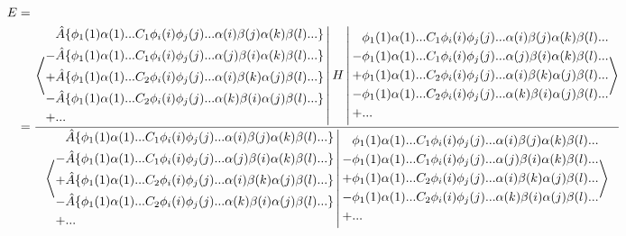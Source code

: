 \documentclass[a4paper]{article}
\begin{document}
 \begin{equation}
 \begin{aligned}
  E &= \\
     &= \frac{    \Braket{   
     \begin{aligned} 
     &\hat{A} \{ \phi_1(1)\alpha(1)... C_1 \phi_i(i) \phi_j(j) ... \alpha(i)\beta(j)\alpha(k)\beta(l)... \}   \\ 
 - &\hat{A} \{ \phi_1(1)\alpha(1)... C_1\phi_i(i) \phi_j(j) ...  \alpha(j)\beta(i)\alpha(k)\beta(l) ... \}\\ 
  +    &\hat{A} \{ \phi_1(1)\alpha(1)... C_2 \phi_i(i) \phi_j(j)... \alpha(i)\beta(k)\alpha(j)\beta(l)... \} \\ 
 - &\hat{A} \{ \phi_1(1)\alpha(1)... C_2\phi_i(i) \phi_j(j) ...  \alpha(k)\beta(i)\alpha(j)\beta(l)... \}\\ 
 +& ...
       \end{aligned} 
       |H|
   \begin{aligned} 
     & \phi_1(1)\alpha(1)... C_1 \phi_i(i) \phi_j(j)... \alpha(i)\beta(j)\alpha(k)\beta(l)...    \\ 
 - & \phi_1(1)\alpha(1)... C_1\phi_i(i) \phi_j(j) ...  \alpha(j)\beta(i)\alpha(k)\beta(l) ... \\ 
  +    & \phi_1(1)\alpha(1)... C_2 \phi_i(i) \phi_j(j)... \alpha(i)\beta(k)\alpha(j)\beta(l)...  \\ 
 - &\phi_1(1)\alpha(1)... C_2\phi_i(i) \phi_j(j) ...  \alpha(k)\beta(i)\alpha(j)\beta(l)... \\ 
 +& ...
       \end{aligned} 
         }   }
       {\Braket{   \begin{aligned} 
&\hat{A} \{ \phi_1(1)\alpha(1)... C_1 \phi_i(i) \phi_j(j) ... \alpha(i)\beta(j)\alpha(k)\beta(l)... \}   \\ 
 - &\hat{A} \{ \phi_1(1)\alpha(1)... C_1\phi_i(i) \phi_j(j) ...  \alpha(j)\beta(i)\alpha(k)\beta(l) ... \}\\ 
  +    &\hat{A} \{ \phi_1(1)\alpha(1)... C_2 \phi_i(i) \phi_j(j)... \alpha(i)\beta(k)\alpha(j)\beta(l)... \} \\ 
 - &\hat{A} \{ \phi_1(1)\alpha(1)... C_2\phi_i(i) \phi_j(j) ...  \alpha(k)\beta(i)\alpha(j)\beta(l)... \}\\ 
 +& ...
       \end{aligned}
              |
   \begin{aligned} 
      & \phi_1(1)\alpha(1)... C_1 \phi_i(i) \phi_j(j)... \alpha(i)\beta(j)\alpha(k)\beta(l)...    \\ 
 - & \phi_1(1)\alpha(1)... C_1\phi_i(i) \phi_j(j) ...  \alpha(j)\beta(i)\alpha(k)\beta(l) ... \\ 
  +    & \phi_1(1)\alpha(1)... C_2 \phi_i(i) \phi_j(j)... \alpha(i)\beta(k)\alpha(j)\beta(l)...  \\ 
 - &\phi_1(1)\alpha(1)... C_2\phi_i(i) \phi_j(j) ...  \alpha(k)\beta(i)\alpha(j)\beta(l)... \\ 
 +& ...
       \end{aligned}
       }} 
     \label{gen_energy}
     \end{aligned}
     \end{equation}
\end{document}
